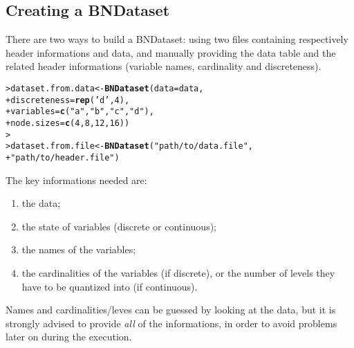 \documentclass{article}\usepackage[]{graphicx}\usepackage[]{color}
\makeatletter
\newcommand{\hlnum}[1]{\textcolor[rgb]{0.686,0.059,0.569}{#1}}%
\newcommand{\hlstr}[1]{\textcolor[rgb]{0.192,0.494,0.8}{#1}}%
\newcommand{\hlstd}[1]{\textcolor[rgb]{0.345,0.345,0.345}{#1}}%
\newcommand{\hlkwb}[1]{\textcolor[rgb]{0.69,0.353,0.396}{#1}}%
\newcommand{\hlkwc}[1]{\textcolor[rgb]{0.333,0.667,0.333}{#1}}%
\newcommand{\hlkwd}[1]{\textcolor[rgb]{0.737,0.353,0.396}{\textbf{#1}}}%
\newenvironment{kframe}{%
 \def\at@end@of@kframe{}%
 \ifinner\ifhmode%
  \def\at@end@of@kframe{\end{minipage}}%
  \begin{minipage}{\columnwidth}%
 \fi\fi%
 \def\FrameCommand##1{\hskip\@totalleftmargin \hskip-\fboxsep
 \colorbox{shadecolor}{##1}\hskip-\fboxsep
     \hskip-\linewidth \hskip-\@totalleftmargin \hskip\columnwidth}%
 \MakeFramed {\advance\hsize-\width
   \@totalleftmargin\z@ \linewidth\hsize
   \@setminipage}}%
 {\par\unskip\endMakeFramed%
 \at@end@of@kframe}
\newenvironment{knitrout}{}{} %
\makeatother
\begin{document}
\subsection{Creating a BNDataset}
There are two ways to build a BNDataset: using two files containing respectively header informations
and data, and manually providing the data table and the related header informations
(variable names, cardinality and discreteness).

\begin{knitrout}
\color{fgcolor}\begin{kframe}
\begin{alltt}
\hlstd{> }\hlstd{dataset.from.data} \hlkwb{<-} \hlkwd{BNDataset}\hlstd{(}\hlkwc{data} \hlstd{= data,}
\hlstd{+ }                               \hlkwc{discreteness} \hlstd{=} \hlkwd{rep}\hlstd{(}\hlstr{'d'}\hlstd{,}\hlnum{4}\hlstd{),}
\hlstd{+ }                               \hlkwc{variables} \hlstd{=} \hlkwd{c}\hlstd{(}\hlstr{"a"}\hlstd{,} \hlstr{"b"}\hlstd{,} \hlstr{"c"}\hlstd{,} \hlstr{"d"}\hlstd{),}
\hlstd{+ }                               \hlkwc{node.sizes} \hlstd{=} \hlkwd{c}\hlstd{(}\hlnum{4}\hlstd{,}\hlnum{8}\hlstd{,}\hlnum{12}\hlstd{,}\hlnum{16}\hlstd{))}
\hlstd{> }
\hlstd{> }\hlstd{dataset.from.file} \hlkwb{<-} \hlkwd{BNDataset}\hlstd{(}\hlstr{"path/to/data.file"}\hlstd{,}
\hlstd{+ }                               \hlstr{"path/to/header.file"}\hlstd{)}
\end{alltt}
\end{kframe}
\end{knitrout}

The key informations needed are:
\begin{enumerate}
\item the data;
\item the state of variables (discrete or continuous);
\item the names of the variables;
\item the cardinalities of the variables (if discrete), or the number of levels they have to be quantized into
(if continuous). 
\end{enumerate}
Names and cardinalities/leves can be guessed by looking at the data, but it is strongly advised to provide
\textit{all} of the informations, in order to avoid problems later on during the execution.
\end{document}
